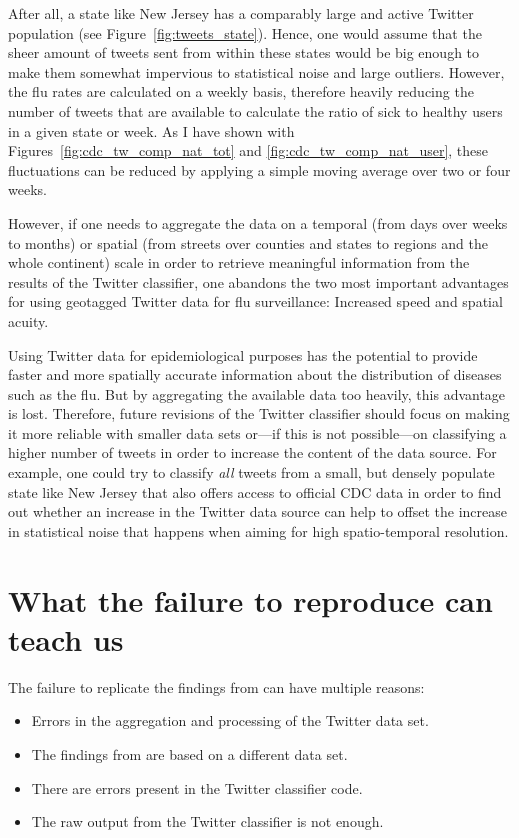 \documentclass[11pt, a4paper,twoside]{report}\usepackage[]{graphicx}\usepackage[]{color}
\begin{document}
After all, a state like New Jersey has a comparably large and active Twitter population (see Figure~\ref{fig:tweets_state}). Hence, one would assume that the sheer amount of tweets sent from within these states would be big enough to make them somewhat impervious to statistical noise and large outliers. However, the flu rates are calculated on a weekly basis, therefore heavily reducing the number of tweets that are available to calculate the ratio of sick to healthy users in a given state or week. As I have shown with Figures~\ref{fig:cdc_tw_comp_nat_tot} and \ref{fig:cdc_tw_comp_nat_user}, these fluctuations can be reduced by applying a simple moving average over two or four weeks.

However, if one needs to aggregate the data on a temporal (from days over weeks to months) or spatial (from streets over counties and states to regions and the whole continent) scale in order to retrieve meaningful information from the results of the Twitter classifier, one abandons the two most important advantages for using geotagged Twitter data for flu surveillance: Increased speed and spatial acuity.

Using Twitter data for epidemiological purposes has the potential to provide faster and more spatially accurate information about the distribution of diseases such as the flu. But by aggregating the available data too heavily, this advantage is lost. Therefore, future revisions of the Twitter classifier should focus on making it more reliable with smaller data sets or---if this is not possible---on classifying a higher number of tweets in order to increase the content of the data source. For example, one could try to classify \textit{all} tweets from a small, but densely populate state like New Jersey that also offers access to official CDC data in order to find out whether an increase in the Twitter data source can help to offset the increase in statistical noise that happens when aiming for high spatio-temporal resolution.

\section{What the failure to reproduce can teach us}
\label{sec:disc_replication}
The failure to replicate the findings from \cite{bodnar_data_2015} can have multiple reasons: 

\begin{itemize}
\item Errors in the aggregation and processing of the Twitter data set.
\item The findings from \cite{bodnar_data_2015} are based on a different data set.
\item There are errors present in the Twitter classifier code.
\item The raw output from the Twitter classifier is not enough.
\end{itemize}
\end{document}
